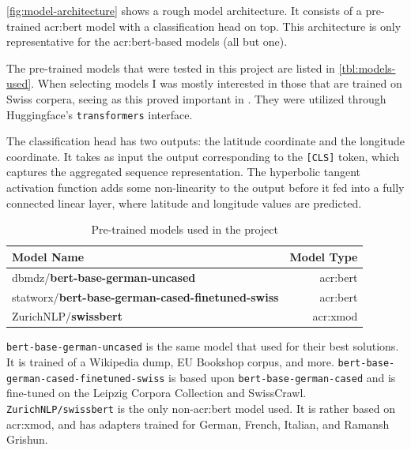 \autoref{fig:model-architecture} shows a rough model architecture. It consists of a pre-trained \acrshort{acr:bert} model with a classification head on top. This architecture is only representative for the \acrshort{acr:bert}-based models (all but one).

The pre-trained models that were tested in this project are listed in \autoref{tbl:models-used}. When selecting models I was mostly interested in those that are trained on Swiss corpera, seeing as this proved important in \cite{scherrerHeLjuVarDial20202020}. They were utilized through Huggingface's \texttt{transformers} interface.

The classification head has two outputs: the latitude coordinate and the longitude coordinate. It takes as input the output corresponding to the \texttt{[CLS]} token, which captures the aggregated sequence representation. The hyperbolic tangent activation function adds some non-linearity to the output before it fed into a fully connected linear layer, where latitude and longitude values are predicted.

\begin{table}
    \centering
    \begin{tabular}{l|r}
        \toprule
        Model Name                                               & Model Type          \\
        \midrule
        dbmdz/\textbf{bert-base-german-uncased}                  & \acrshort{acr:bert} \\
        statworx/\textbf{bert-base-german-cased-finetuned-swiss} & \acrshort{acr:bert} \\
        ZurichNLP/\textbf{swissbert}                             & \acrshort{acr:xmod} \\
        \bottomrule
    \end{tabular}
    \caption{Pre-trained models used in the project}
    \label{tbl:models-used}
\end{table}

\texttt{bert-base-german-uncased} is the same model that \cite{scherrerHeLjuVarDial20202020} used for their best solutions. It is trained of a Wikipedia dump, EU Bookshop corpus, and more. \texttt{bert-base-german-cased-finetuned-swiss} is based upon \texttt{bert-base-german-cased} and is fine-tuned on the Leipzig Corpora Collection and SwissCrawl. \texttt{ZurichNLP/swissbert} is the only non-\acrshort{acr:bert} model used. It is rather based on \acrshort{acr:xmod}, and has adapters trained for German, French, Italian, and Ramansh Grishun.

